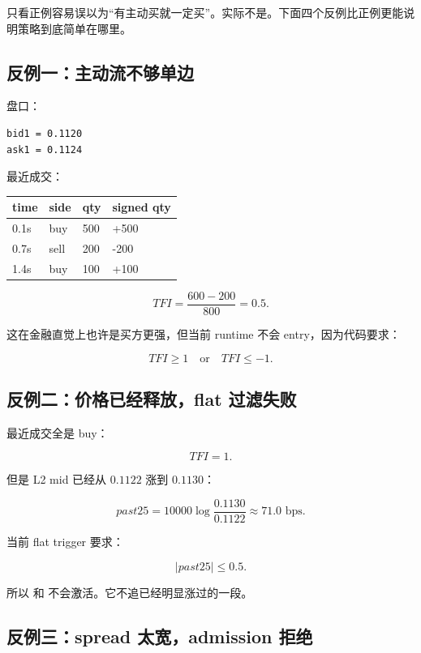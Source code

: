 只看正例容易误以为“有主动买就一定买”。实际不是。下面四个反例比正例更能说明策略到底简单在哪里。

\subsection{反例一：主动流不够单边}

盘口：

\begin{lstlisting}
bid1 = 0.1120
ask1 = 0.1124
\end{lstlisting}

最近成交：

\begin{longtable}{p{}p{}p{}p{}}
\toprule
time & side & qty & signed qty \\
\midrule
0.1s & buy & 500 & +500 \\
0.7s & sell & 200 & -200 \\
1.4s & buy & 100 & +100 \\
\bottomrule
\end{longtable}

\[
TFI=\frac{600-200}{800}=0.5.
\]

这在金融直觉上也许是买方更强，但当前 runtime 不会 entry，因为代码要求：

\[
TFI \ge 1 \quad\text{or}\quad TFI \le -1.
\]


\subsection{反例二：价格已经释放，flat 过滤失败}

最近成交全是 buy：

\[
TFI=1.
\]

但是 L2 mid 已经从 \(0.1122\) 涨到 \(0.1130\)：

\[
past25=10000\log\frac{0.1130}{0.1122}\approx71.0\text{ bps}.
\]

当前 flat trigger 要求：

\[
|past25|\le0.5.
\]

所以  和  不会激活。它不追已经明显涨过的一段。

\subsection{反例三：spread 太宽，admission 拒绝}

